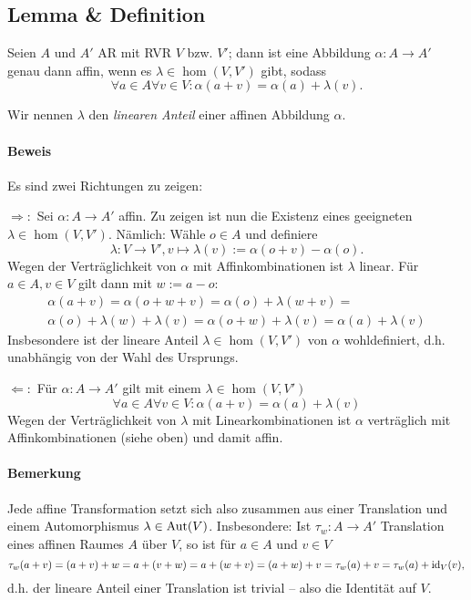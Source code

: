  \subsection{Lemma \& Definition}
 	\begin{Lemma}
 		Seien $ A $ und $ A' $ AR mit RVR $ V $ bzw. $ V' $; dann ist eine Abbildung $ \alpha:A\to A' $ genau dann affin, wenn es $ \lambda\in\hom(V,V') $ gibt, sodass
 		\[
 			\forall a\in A\forall v\in V:\alpha(a+v)=\alpha(a)+\lambda(v).
 		\]
 	\end{Lemma}
 	\begin{Definition}
 		Wir nennen $ \lambda $ den \emph{linearen Anteil} einer affinen Abbildung $ \alpha $.
 	\end{Definition}
 	\paragraph{Beweis}
 		Es sind zwei Richtungen zu zeigen:

 		$ \Rightarrow: $ Sei $ \alpha:A\to A' $ affin. Zu zeigen ist nun die Existenz eines geeigneten $ \lambda \in\hom(V,V') $. Nämlich: Wähle $ o\in A $ und definiere
 		\[
 			\lambda:V\to V',v\mapsto \lambda(v):=\alpha(o+v)-\alpha(o).
 		\]
 		Wegen der Verträglichkeit von $ \alpha $ mit Affinkombinationen ist $ \lambda $ linear. Für $ a\in A,v\in V $ gilt dann mit $ w:=a-o $:
 		\begin{gather*}
 			\alpha(a+v) = \alpha(o+w+v) = \alpha(o)+\lambda(w+v) =\\ \alpha(o)+\lambda(w)+\lambda(v) = \alpha(o+w)+\lambda(v) = \alpha(a)+\lambda(v)
 		\end{gather*}
 		Insbesondere ist der lineare Anteil $ \lambda \in\hom(V,V')$ von $ \alpha $ wohldefiniert, d.h. unabhängig von der Wahl des Ursprungs.

 		$ \Leftarrow: $ Für $ \alpha:A\to A' $ gilt mit einem $ \lambda\in\hom(V,V') $
 		\[
 			\forall a\in A\forall v\in V:\alpha(a+v)=\alpha(a)+\lambda(v)
 		\]
 		Wegen der Verträglichkeit von $ \lambda $ mit Linearkombinationen ist $ \alpha $ verträglich mit Affinkombinationen (siehe oben) und damit affin.
 	\paragraph{Bemerkung}
 		Jede affine Transformation setzt sich also zusammen aus einer Translation und einem Automorphismus $ \lambda \in \operatorname{Aut}(V) $. Insbesondere: Ist $ \tau_w:A\to A' $ Translation eines affinen Raumes $ A $ über $ V $, so ist für $ a\in A $ und $ v\in V $
 		\[
 			\tau_w(a+v) = (a+v)+w = a+(v+w) = a+(w+v) = (a+w)+v = \tau_w(a)+v = \tau_w(a)+\operatorname{id}_V(v),
 		\]
 		d.h. der lineare Anteil einer Translation ist trivial -- also die Identität auf $ V $.
